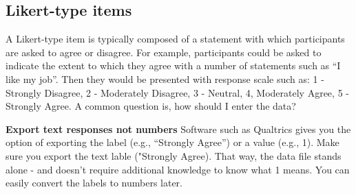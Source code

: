\documentclass[
]{krantz}
\begin{document}
\hypertarget{likert-type-items}{%
\subsection{Likert-type items}\label{likert-type-items}}

A Likert-type item is typically composed of a statement with which participants are asked to agree or disagree. For example, participants could be asked to indicate the extent to which they agree with a number of statements such as ``I like my job''. Then they would be presented with response scale such as: 1 - Strongly Disagree, 2 - Moderately Disagree, 3 - Neutral, 4, Moderately Agree, 5 - Strongly Agree. A common question is, how should I enter the data?

\textbf{Export text responses not numbers} Software such as Qualtrics gives you the option of exporting the label (e.g., ``Strongly Agree'') or a value (e.g., 1). Make sure you export the text lable ("Strongly Agree). That way, the data file stands alone - and doesn't require additional knowledge to know what 1 means. You can easily convert the labels to numbers later.
\end{document}
